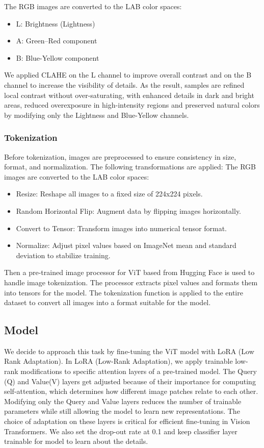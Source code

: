 \documentclass[twocolumn]{article}
\begin{document}
The RGB images are converted to the LAB color spaces:
\begin{itemize}
    \item L: Brightness (Lightness)
    \item A: Green–Red component
    \item B: Blue-Yellow component
\end{itemize}

We applied CLAHE on the L channel to improve overall contrast and on the B channel to increase the visibility of details. As the result, samples are refined local contrast without over-saturating, with enhanced details in dark and bright areas, reduced overexposure in high-intensity regions and preserved natural colors by modifying only the Lightness and Blue-Yellow channels.

\subsubsection{Tokenization}
Before tokenization, images are preprocessed to ensure consistency in size, format, and normalization. The following transformations are applied:
The RGB images are converted to the LAB color spaces:
\begin{itemize}
    \item Resize: Reshape all images to a fixed size of 224x224 pixels.
    \item Random Horizontal Flip: Augment data by flipping images horizontally.
    \item Convert to Tensor: Transform images into numerical tensor format.
    \item Normalize: Adjust pixel values based on ImageNet\cite{imagenet_cvpr09} mean and standard deviation to stabilize training.
\end{itemize}

Then a pre-trained image processor for ViT based\cite{dosovitskiy2020image} from Hugging Face\cite{HugginFace} is used to handle image tokenization. The processor extracts pixel values and formats them into tensors for the model. The tokenization function is applied to the entire dataset to convert all images into a format suitable for the model.

\subsection{Model}
We decide to approach this task by fine-tuning the ViT model with LoRA (Low Rank Adaptation)\cite{hu2022lora}. In LoRA (Low-Rank Adaptation), we apply trainable low-rank modifications to specific attention layers of a pre-trained model. The Query (Q) and Value(V) layers get adjusted because of their importance for computing self-attention, which determines how different image patches relate to each other. Modifying only the Query and Value layers reduces the number of trainable parameters while still allowing the model to learn new representations. The choice of adaptation on these layers is critical for efficient fine-tuning in Vision Transformers. We also set the drop-out rate at 0.1 and keep classifier layer trainable for model to learn about the details.
\end{document}
